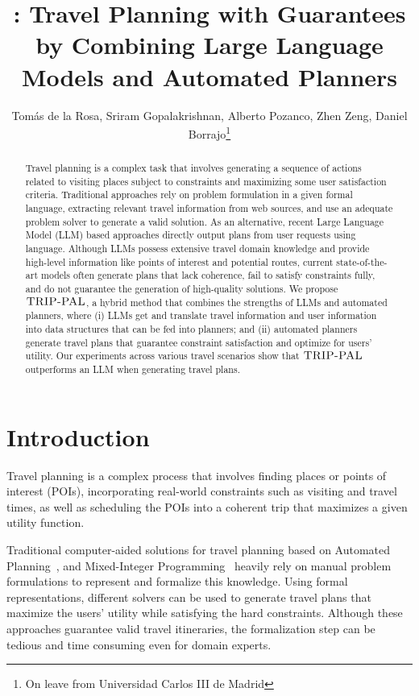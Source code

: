 \documentclass[letterpaper]{article}
\title{\approach: Travel Planning with Guarantees by Combining Large Language Models and Automated Planners}
\author{Tomás de la Rosa, Sriram Gopalakrishnan, Alberto Pozanco, Zhen Zeng,  Daniel Borrajo\thanks{On leave from Universidad Carlos III de Madrid}}
\newcommand{\approach}{\ensuremath{\textsc{TRIP-PAL}}\xspace}
\begin{document}
\maketitle

\begin{abstract}
Travel planning is a complex task that involves generating a sequence of actions related to visiting places subject to constraints and maximizing some user satisfaction criteria. 
Traditional approaches rely on problem formulation in a given formal language, extracting relevant travel information from web sources, and use an adequate problem solver to generate a valid solution. As an alternative, recent Large Language Model (LLM) based approaches directly output plans from user requests using language. Although LLMs possess extensive travel domain knowledge and provide high-level information like points of interest and potential routes, current state-of-the-art models often generate plans that lack coherence, fail to satisfy constraints fully, and do not guarantee the generation of high-quality solutions.
We propose \approach, a hybrid method that combines the strengths of LLMs and automated planners, where (i) LLMs get and translate travel information and user information into data structures that can be fed into planners; and (ii) automated planners generate travel plans that guarantee constraint satisfaction and optimize for users' utility.
Our experiments across various travel scenarios show that  \approach outperforms an LLM when generating  travel plans. 
\end{abstract}

\section{Introduction}

Travel planning is a complex process that involves finding places or points of interest (POIs), incorporating real-world constraints such as visiting and travel times, as well as scheduling the POIs into a coherent trip that maximizes a given utility function.

Traditional computer-aided solutions for travel planning based on Automated Planning~\cite{HTN_temporal_travel_plan}, and Mixed-Integer Programming~\cite{MIP_travel_planner} heavily rely on manual problem formulations to represent and formalize this knowledge.
Using formal representations, different solvers can be used to generate travel plans that maximize the users' utility while satisfying the hard constraints.
Although these approaches guarantee valid travel itineraries, the formalization step can be tedious and time consuming even for domain experts.
\end{document}
